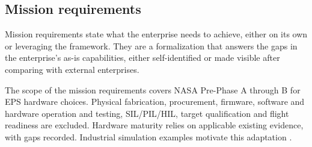 \subsection{Mission requirements}
\label{subsection:framework-mission-requirements}
\label{subsection:framework-mission-needs}
\label{subsection:eps-reference-lifecycle}

Mission requirements state what the enterprise needs to achieve, either on its own or leveraging the framework. They are a formalization that answers the gaps in the enterprise's as-is capabilities, either self-identified or made visible after comparing with external enterprises.

The scope of the mission requirements covers NASA Pre-Phase A through B for EPS hardware choices. Physical fabrication, procurement, firmware, software and hardware operation and testing, SIL/PIL/HIL, target qualification and flight readiness are excluded. Hardware maturity relies on applicable existing evidence, with gaps recorded. Industrial simulation examples motivate this adaptation \citep[slides~4,~13,~18]{handpicked-0002}.

